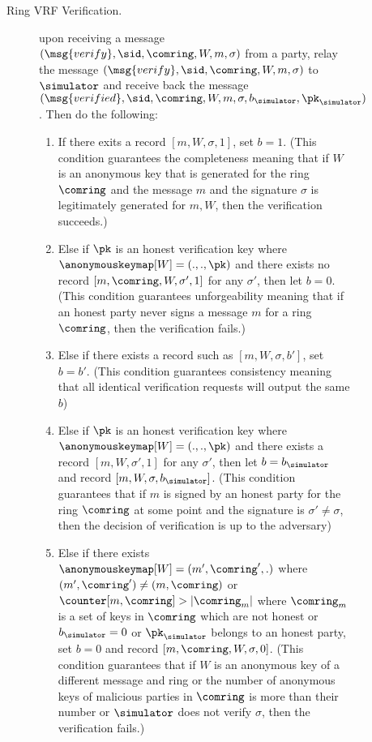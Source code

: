 \begin{figure}
\begin{tcolorbox}
{\begin{description}
				\item[Ring VRF Verification.] upon receiving a message $(\msg{verify}, \sid, \comring,W, m, \sigma)$ from a party, relay the message $(\msg{verify}, \sid, \comring,W, m, \sigma)$ to $ \simulator $ and receive back the message $(\msg{verified}, \sid, \comring,W, m, \sigma, b_{\simulator}, \pk_\simulator)$. Then do the following: 
				\begin{enumerate}[label={{Cond.-} }{{\arabic*}}, start = 1]
					\item If there exits a record $ [m,W,\sigma, 1] $, set $ b = 1 $. (This condition guarantees the completeness meaning that if  $ W $ is an anonymous key that is generated for the ring $ \comring $ and  the message $ m $ and the signature $ \sigma $ is legitimately generated for $ m, W $, then the verification succeeds.)
					\item Else if $ \pk  $ is an honest verification key where $ \anonymouskeymap[W] = (.,., \pk) $ and there exists no record $ [m, \comring, W, \sigma', 1] $ for any $ \sigma' $, then let $ b= 0  $.
					(This condition guarantees unforgeability meaning that if an honest party never signs a message $ m $ for a ring $ \comring $, then the verification fails.)\label{cond:forgery}
					\item Else if there exists a record  such as $ [m,W,\sigma, b'] $, set $ b = b' $. (This condition guarantees consistency meaning that all identical verification requests will output the same $ b $) \label{cond:consistency}
					\item Else if $ \pk  $ is an honest verification key where $ \anonymouskeymap[W] = (.,., \pk) $ and there exists a record $ [m, W, \sigma', 1] $ for any $ \sigma' $, then let $ b= b_{\simulator} $ and record $ [m, W,\sigma, b_{\simulator}] $. (This condition guarantees that if $ m $ is signed by an honest party for the ring $ \comring $ at some point and the signature is $ \sigma' \neq \sigma $, then the decision of verification is up to the adversary) \label{cond:differentsignature}
					\item \label{cond:forgerymalicious}Else if there exists $ \anonymouskeymap[W] = (m', \comring',.)  $ where $ (m', \comring') \neq (m, \comring) $ or $ \counter[m, \comring] > |\comring_m| $ where $ \comring_m $ is a set of keys in $ \comring $ which are not honest or $ b_{\simulator} = 0 $ or $ \pk_\simulator $ belongs to an honest party, set $ b = 0 $ and record $ [m, \comring,W,\sigma, 0] $. (This condition guarantees that if $ W $ is an anonymous key of a different message and ring or the number of anonymous keys of malicious parties in $ \comring $ is more than their number or     $ \simulator $ does not verify $ \sigma $, then the verification fails.)

\end{enumerate}
\end{description}}
\end{tcolorbox}
\end{figure}
